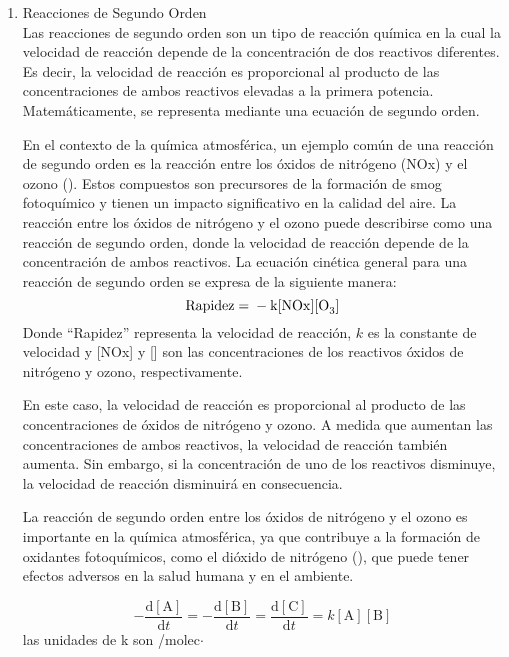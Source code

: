 \begin{enumerate}
\item Reacciones de Segundo Orden  \\
Las reacciones de segundo orden son un tipo de reacción química en la cual la velocidad de reacción depende de la concentración de dos reactivos diferentes. Es decir, la velocidad de reacción es proporcional al producto de las concentraciones de ambos reactivos elevadas a la primera potencia. Matemáticamente, se representa mediante una ecuación de segundo orden.

En el contexto de la química atmosférica, un ejemplo común de una reacción de segundo orden es la reacción entre los óxidos de nitrógeno (NOx) y el ozono (). Estos compuestos son precursores de la formación de smog fotoquímico y tienen un impacto significativo en la calidad del aire.
La reacción entre los óxidos de nitrógeno y el ozono puede describirse como una reacción de segundo orden, donde la velocidad de reacción depende de la concentración de ambos reactivos. La ecuación cinética general para una reacción de segundo orden se expresa de la siguiente manera:
 \begin{equation*}
\ce{Rapidez = - k[NOx][O3]}
 \end{equation*}
Donde ``Rapidez'' representa la velocidad de reacción, $k$ es la constante de velocidad y [NOx] y [] son las concentraciones de los reactivos óxidos de nitrógeno y ozono, respectivamente.

En este caso, la velocidad de reacción es proporcional al producto de las concentraciones de óxidos de nitrógeno y ozono. A medida que aumentan las concentraciones de ambos reactivos, la velocidad de reacción también aumenta. Sin embargo, si la concentración de uno de los reactivos disminuye, la velocidad de reacción disminuirá en consecuencia.

La reacción de segundo orden entre los óxidos de nitrógeno y el ozono es importante en la química atmosférica, ya que contribuye a la formación de oxidantes fotoquímicos, como el dióxido de nitrógeno (), que puede tener efectos adversos en la salud humana y en el  ambiente.

 \begin{equation*}
	-\frac{\mathrm{d}[\textrm{A}]}{\mathrm{d}t}=-\frac{\mathrm{d}[\textrm{B}]}{\mathrm{d}t}=\frac{\mathrm{d}[\textrm{C}]}{\mathrm{d}t}=k[\textrm{A}][\textrm{B}]
	\end{equation*}
	las unidades de k son {\centi\cubic\metre}/{molec$\cdot $\second}
	

\end{enumerate}

